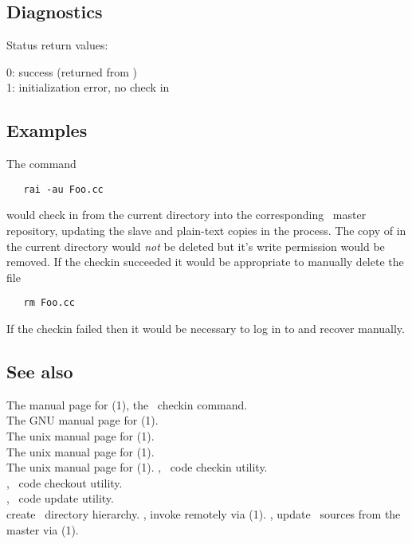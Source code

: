 \subsection*{Diagnostics}
 
Status return values:
\begin{status}
   0:  success (returned from )\\
   1:  initialization error, no check in\\
\end{status}
 
\subsection*{Examples}
 
The command
 
\begin{verbatim}
   rai -au Foo.cc
\end{verbatim}
 
\noindent
would check in  from the current directory into the corresponding
\aipspp\ master repository, updating the slave and plain-text copies in the
process.  The copy of  in the current directory would \emph{not}
be deleted but it's write permission would be removed.  If the checkin
succeeded it would be appropriate to manually delete the file

\begin{verbatim}
   rm Foo.cc
\end{verbatim}
 
\noindent
If the checkin failed then it would be necessary to log in to
 and recover manually.

\subsection*{See also}

The manual page for (1), the \rcs\ checkin command.\\
The GNU manual page for (1).\\
The unix manual page for (1).\\
The unix manual page for (1).\\
The unix manual page for (1).
, \aipspp\ code checkin utility.\\
, \aipspp\ code checkout utility.\\
, \aipspp\ code update utility.\\
 create \aipspp\ directory hierarchy.
, invoke  remotely via (1).
, update \aipspp\ sources from the master via (1).\\
 
